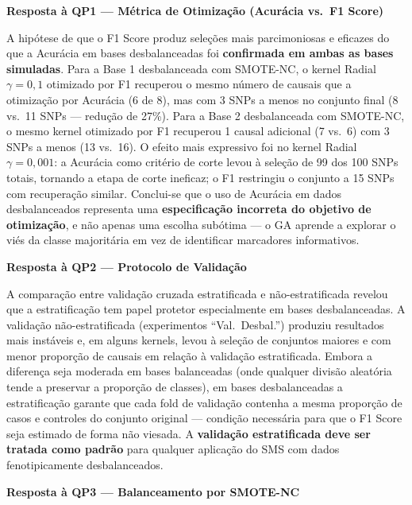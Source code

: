 \documentclass[
    12pt,
    a4paper,
    oneside,
    english,
    french,
    spanish,
    brazil
    ]{abntex2}
\newcommand{\novo}[1]{\textcolor{corNova}{#1}}
\begin{document}
\bigskip
\noindent\textbf{Resposta à QP1 --- Métrica de Otimização (Acurácia vs.\ F1 Score)}

\novo{A hipótese de que o F1 Score produz seleções mais parcimoniosas e eficazes do que a Acurácia em bases desbalanceadas foi \textbf{confirmada em ambas as bases simuladas}. Para a Base 1 desbalanceada com SMOTE-NC, o kernel Radial $\gamma = 0{,}1$ otimizado por F1 recuperou o mesmo número de causais que a otimização por Acurácia (6 de 8), mas com 3 SNPs a menos no conjunto final (8 vs.\ 11 SNPs --- redução de 27\%). Para a Base 2 desbalanceada com SMOTE-NC, o mesmo kernel otimizado por F1 recuperou 1 causal adicional (7 vs.\ 6) com 3 SNPs a menos (13 vs.\ 16). O efeito mais expressivo foi no kernel Radial $\gamma = 0{,}001$: a Acurácia como critério de corte levou à seleção de 99 dos 100 SNPs totais, tornando a etapa de corte ineficaz; o F1 restringiu o conjunto a 15 SNPs com recuperação similar. Conclui-se que o uso de Acurácia em dados desbalanceados representa uma \textbf{especificação incorreta do objetivo de otimização}, e não apenas uma escolha subótima --- o GA aprende a explorar o viés da classe majoritária em vez de identificar marcadores informativos.}

\bigskip
\noindent\textbf{Resposta à QP2 --- Protocolo de Validação}

\novo{A comparação entre validação cruzada estratificada e não-estratificada revelou que a estratificação tem papel protetor especialmente em bases desbalanceadas. A validação não-estratificada (experimentos ``Val.\ Desbal.'') produziu resultados mais instáveis e, em alguns kernels, levou à seleção de conjuntos maiores e com menor proporção de causais em relação à validação estratificada. Embora a diferença seja moderada em bases balanceadas (onde qualquer divisão aleatória tende a preservar a proporção de classes), em bases desbalanceadas a estratificação garante que cada fold de validação contenha a mesma proporção de casos e controles do conjunto original --- condição necessária para que o F1 Score seja estimado de forma não viesada. A \textbf{validação estratificada deve ser tratada como padrão} para qualquer aplicação do SMS com dados fenotipicamente desbalanceados.}

\bigskip
\noindent\textbf{Resposta à QP3 --- Balanceamento por SMOTE-NC}
\end{document}
